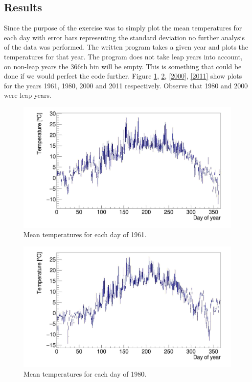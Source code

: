 \subsection{Results}
Since the purpose of the exercise was to simply plot the mean temperatures for each day with error bars representing the standard deviation no further analysis of the data was performed. The written program takes a given year and plots the temperatures for that year. The program does not take leap years into account, on non-leap years the 366th bin will be empty. This is something that could be done if we would perfect the code further. Figure \ref{1961}, \ref{1980}, \ref{2000}, \ref{2011} show plots for the years 1961, 1980, 2000 and 2011 respectively. Observe that 1980 and 2000 were leap years.

\begin{figure}
    \centering
    \includegraphics[width=14cm]{eachday1961.jpg}
    \caption{Mean temperatures for each day of 1961.}
    \label{1961}
\end{figure}

\begin{figure}
    \centering
    \includegraphics[width=14cm]{eachday1980.jpg}
    \caption{Mean temperatures for each day of 1980.}
    \label{1980}
\end{figure}


